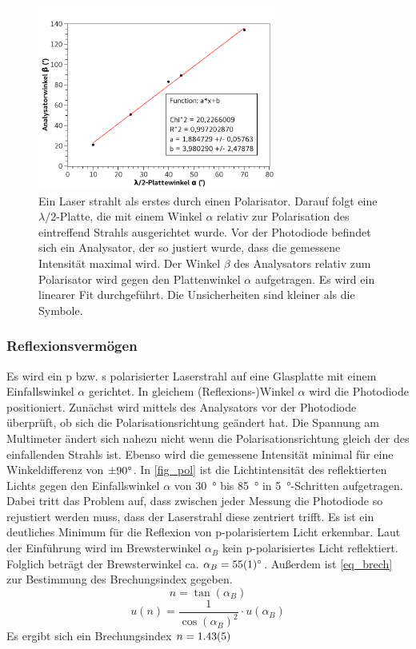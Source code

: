 \documentclass[
	a4paper,
	12pt,
	pagesize,
	ngerman
]{scrartcl}
\begin{document}
	\begin{figure}[H]
		\includegraphics[width=0.7\textwidth]{fig_lambda}
		\centering
		\caption{Ein Laser strahlt als erstes durch einen Polarisator. 
		Darauf folgt eine $\lambda/2$-Platte, die mit einem Winkel $\alpha$ relativ zur Polarisation des eintreffend Strahls ausgerichtet wurde. 
		Vor der Photodiode befindet sich ein Analysator, der so justiert wurde, dass die gemessene Intensität maximal wird.
		Der Winkel $\beta$ des Analysators relativ zum Polarisator wird gegen den Plattenwinkel $\alpha$ aufgetragen.
		Es wird ein linearer Fit durchgeführt.
		Die Unsicherheiten sind kleiner als die Symbole.} %
		\label{fig_lambda}
		\centering
	\end{figure}
	\subsubsection{Reflexionsvermögen}
	Es wird ein p bzw. s polarisierter Laserstrahl auf eine Glasplatte mit einem Einfallswinkel $\alpha$ gerichtet.
	In gleichem (Reflexions-)Winkel $\alpha$ wird die Photodiode positioniert.
	Zunächst wird mittels des Analysators vor der Photodiode überprüft, ob sich die Polarisationsrichtung geändert hat. 
	Die Spannung am Multimeter ändert sich nahezu nicht wenn die Polarisationsrichtung gleich der des einfallenden Strahls ist. 
	Ebenso wird die gemessene Intensität minimal für eine Winkeldifferenz von $\SI{\pm90}{\degree}$.
	In \cref{fig_pol} ist die Lichtintensität des reflektierten Lichts gegen den Einfallswinkel $\alpha$ von \SI{30}{\degree} bis \SI{85}{\degree} in \SI{5}{\degree}-Schritten aufgetragen.
	Dabei tritt das Problem auf, dass zwischen jeder Messung die Photodiode so rejustiert werden muss, dass der Laserstrahl diese zentriert trifft.
	Es ist ein deutliches Minimum für die Reflexion von p-polarisiertem Licht erkennbar.
	Laut der Einführung wird im Brewsterwinkel $\alpha_B$ kein p-polarisiertes Licht reflektiert.
	Folglich beträgt der Brewsterwinkel ca. $\alpha_B = \SI{55+-1}{\degree}$.
	Außerdem ist \cref{eq_brech} zur Bestimmung des Brechungsindex gegeben.
	\begin{equation}
		n= \tan(\alpha_B)
		\label{eq_brech}
	\end{equation}
	\begin{equation}
		u(n) = \frac{1}{\cos(\alpha_B)^2} \cdot u(\alpha_B)
		\label{eq_unsicher}
	\end{equation}
	Es ergibt sich ein Brechungsindex $n = \SI{1,43 +- 0,05}{}$
\end{document}
